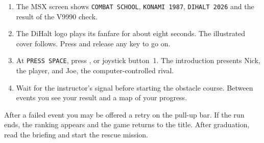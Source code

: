\begin{enumerate}
\item The MSX screen shows \texttt{COMBAT SCHOOL}, \texttt{KONAMI 1987}, \texttt{DIHALT 2026} and the result of the V9990 check.
\item The DiHalt logo plays its fanfare for about eight seconds. The illustrated cover follows. Press and release any key to go on.
\item At \texttt{PRESS SPACE}, press ,  or joystick button~1. The introduction presents Nick, the player, and Joe, the computer-controlled rival.
\item Wait for the instructor's signal before starting the obstacle course. Between events you see your result and a map of your progress.
\end{enumerate}
After a failed event you may be offered a retry on the pull-up bar. If the run ends, the ranking appears and the game returns to the title. After graduation, read the briefing and start the rescue mission.
